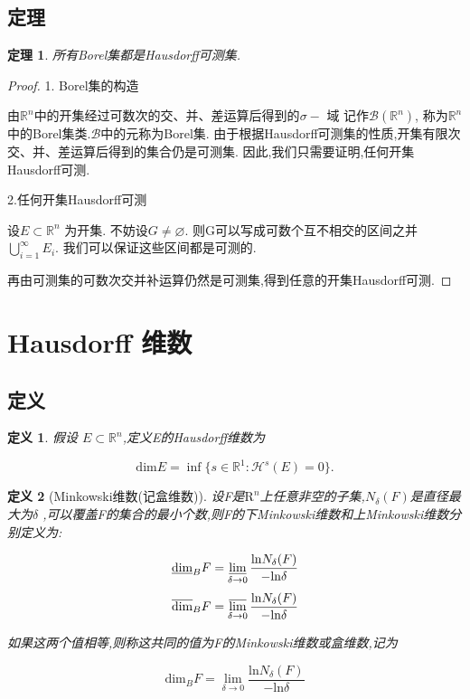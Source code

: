 \documentclass[hyperref,a4paper,UTF8]{ctexart}
\newtheorem{theorem}{定理}[section]
\newtheorem{definition}{定义}[section]
\begin{document}
\subsection{定理}

\begin{theorem}
  
  所有Borel集都是Hausdorff可测集.

\end{theorem}

\begin{proof}
  1. Borel集的构造

  由$\mathbb{R}^n$中的开集经过可数次的交、并、差运算后得到的$\sigma -$ 域 记作$ \mathscr{B}(\mathbb{R}^n)$,
  称为$\mathbb{R}^n$中的Borel集类.$\mathscr{B}$中的元称为Borel集. 
  由于根据Hausdorff可测集的性质,开集有限次交、并、差运算后得到的集合仍是可测集. 
  因此,我们只需要证明,任何开集Hausdorff可测.

  2.任何开集Hausdorff可测

  设$E \subset \mathbb{R}^n$ 为开集. 不妨设$G \neq  \varnothing $.
  则G可以写成可数个互不相交的区间之并
  $\bigcup\limits_{i=1}^{\infty} E_i$. 我们可以保证这些区间都是可测的. 

  再由可测集的可数次交并补运算仍然是可测集,得到任意的开集Hausdorff可测.

\end{proof}

\section{Hausdorff 维数}

\subsection{定义}
\begin{definition}
  假设 \( E \subset \mathbb{R}^n \),定义E的Hausdorff维数为

  \[
    \mathrm{dim} E = \inf\{s \in \mathbb{R}^1: \mathcal{H}^{s}(E) = 0 \}.
  \]

\end{definition}


\begin{definition}[Minkowski维数(记盒维数)]
  设F是$\mathrm{R}^n$上任意非空的子集,$ N_{\delta}(F)$是直径最大为$\delta$ ,可以覆盖F的集合的最小个数,则F的下Minkowski维数和上Minkowski维数分别定义为:

  \[\underline{\mathrm{dim}}_B F = \varliminf\limits_{\delta \rightarrow 0} \frac{\mathrm{ln}N_{\delta}(F)}{-\mathrm{ln}\delta} \]
  \[\overline{\mathrm{dim}}_B F = \varlimsup\limits_{\delta \rightarrow 0} \frac{\mathrm{ln}N_{\delta}(F)}{-\mathrm{ln}\delta} \]

  如果这两个值相等,则称这共同的值为F的Minkowski维数或盒维数,记为

  \[{\mathrm{dim}}_B F = \lim\limits_{\delta \rightarrow 0} \frac{\mathrm{ln}N_{\delta}(F)}{-\mathrm{ln}\delta} \]
\end{definition}
\end{document}
